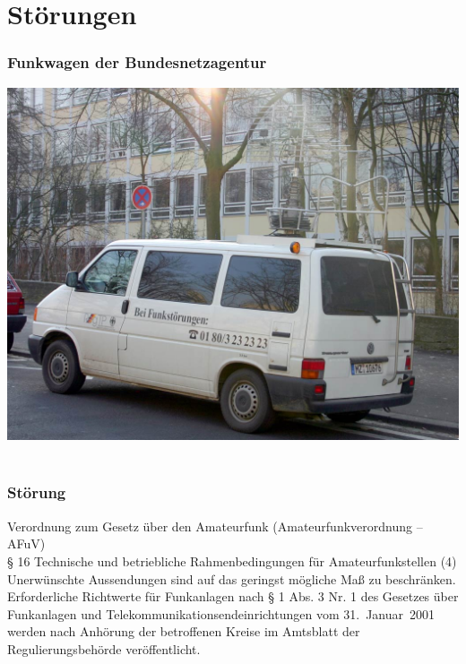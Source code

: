 

\subtitle{Technik A19: \\
            EMV und Sicherheit \\[2em]}
\date{Stand 12.07.2016}


\section*{Störungen}

\begin{frame}
    \frametitle{Funkwagen der Bundesnetzagentur}
    \begin{center}
		\includegraphics[width=1\textwidth,height=.85\textheight,keepaspectratio]{a19/FunkwagenBNetz.jpg}\\
    {\tiny \hyperlink{refs}{\cite{wm}} \\[1em]}
	\end{center}
\end{frame}

\begin{frame}
  \frametitle{Störung}
  \begin{center}
    \begin{block}{Verordnung zum Gesetz über den Amateurfunk (Amateurfunkverordnung -- AFuV) \\
      § 16 Technische und betriebliche Rahmenbedingungen für Amateurfunkstellen}
      (4) Unerwünschte Aussendungen sind auf das geringst mögliche Maß zu beschränken. Erforderliche Richtwerte für Funkanlagen nach § 1 Abs. 3 Nr. 1 des Gesetzes über Funkanlagen und Telekommunikationsendeinrichtungen vom 31.~Januar~2001 werden nach Anhörung der betroffenen Kreise im Amtsblatt der Regulierungsbehörde veröffentlicht.
    \end{block}
  \end{center}
\end{frame}

